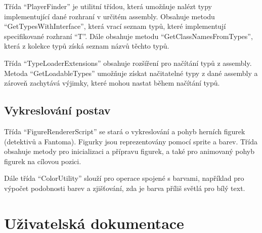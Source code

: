 Třída ``PlayerFinder'' je utilitní třídou, která umožňuje nalézt typy
implementující dané rozhraní v určitém assembly. Obsahuje metodu
``GetTypesWithInterface'', která vrací seznam typů, které implementují
specifikované rozhraní ``T''. Dále obsahuje metodu
``GetClassNamesFromTypes'', která z kolekce typů získá seznam názvů
těchto typů.

Třída ``TypeLoaderExtensions'' obsahuje rozšíření pro načítání typů z
assembly. Metoda ``GetLoadableTypes'' umožňuje získat načitatelné typy z
dané assembly a zároveň zachytává výjimky, které mohou nastat během
načítání typů.

\section{Vykreslování postav}\label{vykreslovuxe1nuxed-postav}

Třída ``FigureRendererScript'' se stará o vykreslování a pohyb herních
figurek (detektivů a Fantoma). Figurky jsou reprezentovány pomocí
sprite a barev. Třída obsahuje metody pro inicializaci a přípravu
figurek, a také pro animovaný pohyb figurek na cílovou pozici.

Dále třída ``ColorUtility'' slouží pro operace spojené s barvami,
například pro výpočet podobnosti barev a zjišťování, zda je barva příliš
světlá pro bílý text.


\chapter{Uživatelská dokumentace}\label{uux17eivatelskuxe1-dokumentace}





